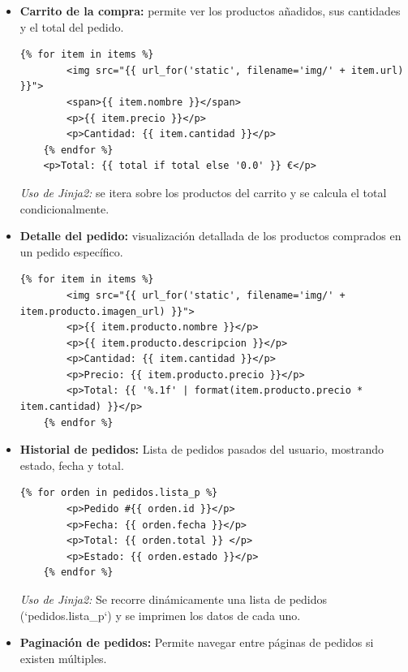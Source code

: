 \documentclass[10pt]{book}
\begin{document}
\begin{itemize}
    \textit{Uso de Jinja2:} muestra los atributos de un único objeto `producto`.

    \item \textbf{Carrito de la compra:} permite ver los productos añadidos, sus cantidades y el total del pedido.

    \begin{lstlisting}[style=bonitoJinja]
    {% for item in items %}
        <img src="{{ url_for('static', filename='img/' + item.url) }}">
        <span>{{ item.nombre }}</span>
        <p>{{ item.precio }}</p>
        <p>Cantidad: {{ item.cantidad }}</p>
    {% endfor %}
    <p>Total: {{ total if total else '0.0' }} €</p>
    \end{lstlisting}

    \textit{Uso de Jinja2:} se itera sobre los productos del carrito y se calcula el total condicionalmente.

    \item \textbf{Detalle del pedido:} visualización detallada de los productos comprados en un pedido específico.

    \begin{lstlisting}[style=bonitoJinja]
    {% for item in items %}
        <img src="{{ url_for('static', filename='img/' + item.producto.imagen_url) }}">
        <p>{{ item.producto.nombre }}</p>
        <p>{{ item.producto.descripcion }}</p>
        <p>Cantidad: {{ item.cantidad }}</p>
        <p>Precio: {{ item.producto.precio }}</p>
        <p>Total: {{ '%.1f' | format(item.producto.precio * item.cantidad) }}</p>
    {% endfor %}
    \end{lstlisting}

  
    \item \textbf{Historial de pedidos:} Lista de pedidos pasados del usuario, mostrando estado, fecha y total.
    
    \begin{lstlisting}[style=bonitoJinja]
    {% for orden in pedidos.lista_p %}
        <p>Pedido #{{ orden.id }}</p>
        <p>Fecha: {{ orden.fecha }}</p>
        <p>Total: {{ orden.total }} </p>
        <p>Estado: {{ orden.estado }}</p>
    {% endfor %}
    \end{lstlisting}
    
    \textit{Uso de Jinja2:} Se recorre dinámicamente una lista de pedidos (`pedidos.lista\_p`) y se imprimen los datos de cada uno.
    

    \item \textbf{Paginación de pedidos:} Permite navegar entre páginas de pedidos si existen múltiples.
    

\end{itemize}
\end{document}
